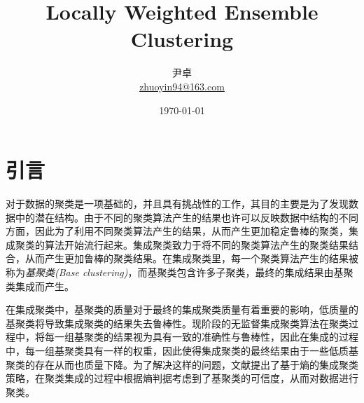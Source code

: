 \documentclass[UTF8, 12pt]{ctexart}
\begin{document}
\title{\heiti \Huge{Locally Weighted Ensemble Clustering}}
\author{\kaishu 尹卓 \\ \href{mailto:zhuoyin94@163.com}{zhuoyin94@163.com}}
\date{\today}
\maketitle

\tableofcontents
\newpage
	
\section{引言}
对于数据的聚类是一项基础的，并且具有挑战性的工作，其目的主要是为了发现数据中的潜在结构。由于不同的聚类算法产生的结果也许可以反映数据中结构的不同方面，因此为了利用不同聚类算法产生的结果，从而产生更加稳定鲁棒的聚类，集成聚类的算法开始流行起来。集成聚类致力于将不同的聚类算法产生的聚类结果结合，从而产生更加鲁棒的聚类结果。在集成聚类里，每一个聚类算法产生的结果被称为\emph{基聚类(Base clustering)}，而基聚类包含许多子聚类，最终的集成结果由基聚类集成而产生。

在集成聚类中，基聚类的质量对于最终的集成聚类质量有着重要的影响，低质量的基聚类将导致集成聚类的结果失去鲁棒性。现阶段的无监督集成聚类算法在聚类过程中，将每一组基聚类的结果视为具有一致的准确性与鲁棒性，因此在集成的过程中，每一组基聚类具有一样的权重，因此使得集成聚类的最终结果由于一些低质基聚类的存在从而也质量下降。为了解决这样的问题，文献\cite{huang2017locally}提出了基于熵的集成聚类策略，在聚类集成的过程中根据熵判据考虑到了基聚类的可信度，从而对数据进行聚类。
\end{document}
